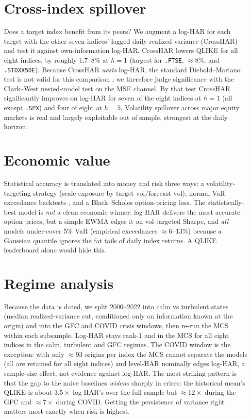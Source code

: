 \documentclass[11pt]{article}
\begin{document}
\section{Cross-index spillover}
Does a target index benefit from its peers? We augment a log-HAR for each target
with the other seven indices' lagged daily realized variance (CrossHAR) and test
it against own-information log-HAR. CrossHAR lowers QLIKE for all eight indices,
by roughly 1.7--8\% at $h=1$ (largest for \texttt{.FTSE}, $\approx$8\%, and
\texttt{.STOXX50E}). Because CrossHAR \emph{nests} log-HAR, the standard
Diebold--Mariano test is not valid for this comparison \cite{diebold2015}; we
therefore judge significance with the Clark--West \cite{clarkwest2007} nested-model test on the
MSE channel. By that test CrossHAR significantly improves on log-HAR for seven of
the eight indices at $h=1$ (all except \texttt{.SPX}) and four of eight at
$h=5$. Volatility spillover across major
equity markets is real and largely exploitable out of sample, strongest at the
daily horizon.

\section{Economic value}
Statistical accuracy is translated into money and risk three ways: a
volatility-targeting strategy (scale exposure by $\text{target vol}/\text{forecast vol}$),
normal-VaR exceedance backtests \cite{kupiec1995,christoffersen1998}, and a
Black--Scholes option-pricing loss. The statistically-best model is \emph{not} a
clean economic winner: log-HAR delivers the most accurate option prices, but a
simple EWMA edges it on vol-targeted Sharpe, and \emph{all} models under-cover
5\% VaR (empirical exceedances $\approx$6--13\%) because a Gaussian quantile
ignores the fat tails of daily index returns. A QLIKE leaderboard alone would hide this.

\section{Regime analysis}
Because the data is dated, we split 2000--2022 into calm vs turbulent states
(median realized-variance cut, conditioned only on information known at the
origin) and into the GFC and COVID crisis windows, then re-run the MCS within
each subsample. Log-HAR stays rank-1 and in the MCS for all eight indices in the
calm, turbulent and GFC regimes. The COVID window is the exception: with only
$\approx$93 origins per index the MCS cannot separate the models (all are
retained for all eight indices) and level-HAR nominally edges log-HAR,
a sample-size effect, not evidence against log-HAR. The most striking pattern is
that the gap to the naive baselines \emph{widens} sharply in crises: the
historical mean's QLIKE is about $3.5\times$ log-HAR's over the full sample but
$\approx 12\times$ during the GFC and $\approx 7\times$ during COVID. Getting the
persistence of variance right matters most exactly when risk is highest.
\end{document}
